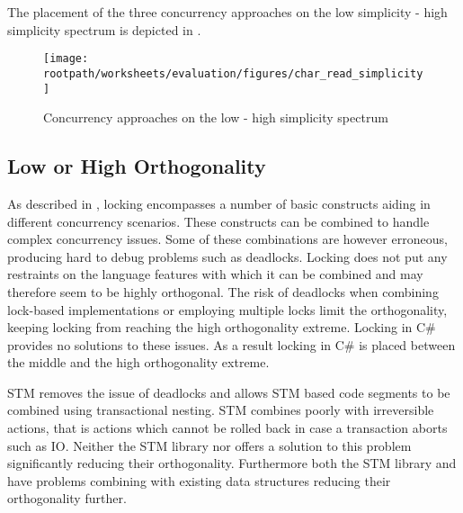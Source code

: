 The placement of the three concurrency approaches on the low simplicity - high simplicity spectrum is depicted in .

\begin{figure}[htbp]
\centering
\texttt{[image: \\rootpath/worksheets/evaluation/figures/char\_read\_simplicity]}
\caption{Concurrency approaches on the low - high simplicity spectrum}
\label{fig:char_simplicity}
\end{figure}
\subsection{Low or High Orthogonality}\label{subsec:orthogonality}
As described in , locking encompasses a number of basic constructs aiding in different concurrency scenarios. These constructs can be combined to handle complex concurrency issues. Some of these combinations are however erroneous, producing hard to debug problems such as deadlocks. Locking does not put any restraints on the language features with which it can be combined and may therefore seem to be highly orthogonal. The risk of deadlocks when combining lock-based implementations or employing multiple locks limit the orthogonality, keeping locking from reaching the high orthogonality extreme. Locking in C\# provides no solutions to these issues. As a result locking in C\# is placed between the middle and the high orthogonality extreme.

\ac{STM} removes the issue of deadlocks and allows \ac{STM} based code segments to be combined using transactional nesting. \ac{STM} combines poorly with irreversible actions, that is actions which cannot be rolled back in case a transaction aborts such as \ac{IO}. Neither the \ac{STM} library nor \stmnamesp offers a solution to this problem significantly reducing their orthogonality. Furthermore both the \ac{STM} library and \stmnamesp have problems combining with existing data structures reducing their orthogonality further.

